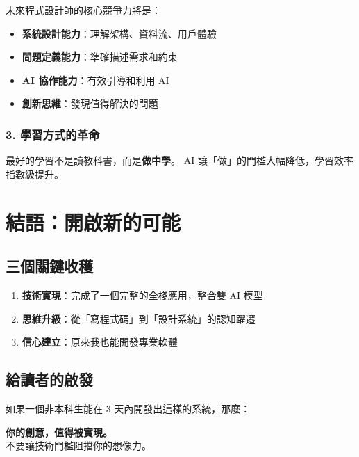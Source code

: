 \documentclass[11pt,a4paper]{article}
\begin{document}
未來程式設計師的核心競爭力將是：
\begin{itemize}
  \item \textbf{系統設計能力}：理解架構、資料流、用戶體驗
  \item \textbf{問題定義能力}：準確描述需求和約束
  \item \textbf{AI 協作能力}：有效引導和利用 AI
  \item \textbf{創新思維}：發現值得解決的問題
\end{itemize}

\subsubsection{3. 學習方式的革命}

\begin{insight}
最好的學習不是讀教科書，而是\textbf{做中學}。
AI 讓「做」的門檻大幅降低，學習效率指數級提升。
\end{insight}

\section{結語：開啟新的可能}

\subsection{三個關鍵收穫}

\begin{enumerate}
  \item \textbf{技術實現}：完成了一個完整的全棧應用，整合雙 AI 模型
  \item \textbf{思維升級}：從「寫程式碼」到「設計系統」的認知躍遷
  \item \textbf{信心建立}：原來我也能開發專業軟體
\end{enumerate}

\subsection{給讀者的啟發}

如果一個非本科生能在 3 天內開發出這樣的系統，那麼：

\begin{tcolorbox}[colback=Brand!5, colframe=Brand]
\centering
\Large
\textbf{你的創意，值得被實現。}\\[5pt]
\normalsize
不要讓技術門檻阻擋你的想像力。
\end{tcolorbox}
\end{document}
